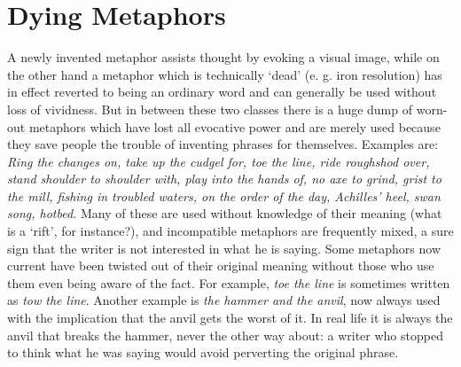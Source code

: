 \documentclass[12pt]{article}
\begin{document}
\section*{Dying Metaphors} A newly invented metaphor assists thought by evoking a visual image, while on the other hand a metaphor which is technically ‘dead’ (e. g. iron resolution) has in effect reverted to being an ordinary word and can generally be used without loss of vividness. But in between these two classes there is a huge dump of worn-out metaphors which have lost all evocative power and are merely used because they save people the trouble of inventing phrases for themselves. Examples are: \textit{Ring the changes on, take up the cudgel for, toe the line, ride roughshod over, stand shoulder to shoulder with, play into the hands of, no axe to grind, grist to the mill, fishing in troubled waters, on the order of the day, Achilles’ heel, swan song, hotbed.} Many of these are used without knowledge of their meaning (what is a `rift’, for instance?), and incompatible metaphors are frequently mixed, a sure sign that the writer is not interested in what he is saying. Some metaphors now current have been twisted out of their original meaning without those who use them even being aware of the fact. For example, \textit{toe the line} is sometimes written as \textit{tow the line}. Another example is \textit{the hammer and the anvil}, now always used with the implication that the anvil gets the worst of it. In real life it is always the anvil that breaks the hammer, never the other way about: a writer who stopped to think what he was saying would avoid perverting the original phrase.
\end{document}
